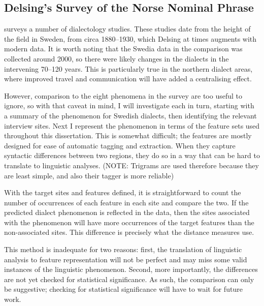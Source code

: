\subsection{Delsing's Survey of the Norse Nominal Phrase}

 surveys a number of dialectology studies. These
studies date from the height of the field in Sweden, from circa
1880--1930, which Delsing at times augments with modern data. It is
worth noting that the Swedia data in the comparison was collected
around 2000, so there were likely changes in the dialects in the
intervening 70--120 years. This is particularly true in the northern
dialect areas, where improved travel and communication will have added
a centralising effect.

However, comparison to the eight phenomena in the survey are too
useful to ignore, so with that caveat in mind, I will investigate each
in turn, starting with a summary of the phenomenon for Swedish
dialects, then identifying the relevant interview sites. Next I
represent the phenomenon in terms of the feature sets used throughout
this dissertation. This is somewhat difficult; the features are mostly
designed for ease of automatic tagging and extraction. When they
capture syntactic differences between two regions, they do so in a way
that can be hard to translate to linguistic analyses. (NOTE: Trigrams
are used therefore because they are least simple, and also their
tagger is more reliable)

With the target sites and features defined, it is straightforward to count the
number of occurrences of each feature in each site and compare the
two. If the predicted dialect phenomenon is reflected in the data,
then the sites associated with the phenomenon will have more
occurrences of the target features than the non-associated sites. This
difference is precisely what the distance measures use.

This method is inadequate for two reasons: first, the translation of
linguistic analysis to feature representation will not be perfect and
may miss some valid instances of the linguistic phenomenon. Second,
more importantly, the differences are not yet checked for statistical
significance. As such, the comparison can only be suggestive;
checking for statistical significance will have to wait for future
work.



